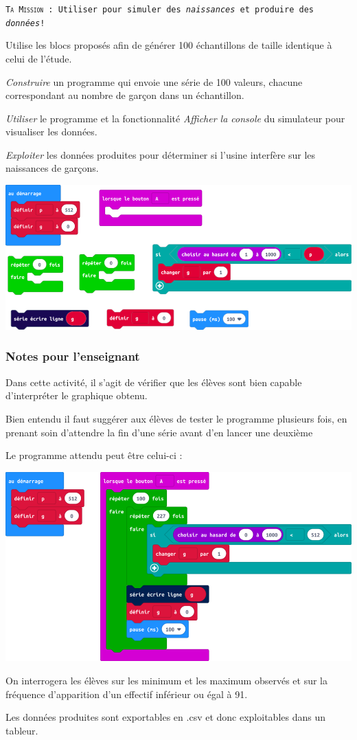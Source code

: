 \begin{eleve}    
    \texttt{\textsc{Ta Mission} : Utiliser \mb pour simuler des \emph{naissances} et produire des \emph{données}!}
    
    Utilise les blocs proposés afin de générer 100 échantillons de taille identique à celui de l'étude.
    
    \emph{Construire} un programme qui envoie une série de 100 valeurs, chacune correspondant au nombre de garçon dans un échantillon.
    
    \emph{Utiliser} le programme et la fonctionnalité \emph{Afficher la console} du simulateur pour visualiser les données.
    
    \emph{Exploiter} les données produites pour déterminer si l'usine interfère sur les naissances de garçons.
    
    \includegraphics[width=0.8\linewidth]{res/mb-fluctuation-activite3-blocs.png}
    
\end{eleve}

\newpage

\subsubsection{Notes pour l'enseignant}

%
%
\begin{methode}
Dans cette activité, il s'agit de vérifier que les élèves sont bien capable d'interpréter le graphique obtenu.

Bien entendu il faut suggérer aux élèves de tester le programme plusieurs fois, en prenant soin d'attendre la fin d'une série avant d'en lancer une deuxième

Le programme attendu peut être celui-ci  :

    \includegraphics[width=0.8\linewidth]{res/mb-fluctuation-activite3-proposition.png}

\end{methode}


\begin{remarque}
   On interrogera les élèves sur les minimum et les maximum observés et sur la fréquence d'apparition d'un effectif inférieur ou égal à 91.
   
   Les données produites sont exportables en .csv et donc exploitables dans un tableur.
\end{remarque}
